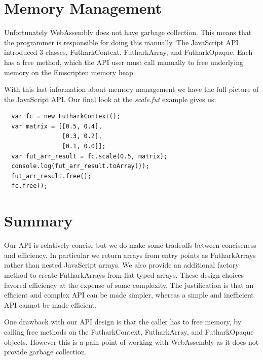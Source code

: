\documentclass[11pt]{book}
\begin{document}
\section{Memory Management}

Unfortunately WebAssembly does not have garbage collection. This means that the programmer is responsible for doing this manually. The JavaScript API introduced 3 classes, FutharkContext, FutharkArray, and FutharkOpaque. Each has a free method, which the API user must call manually to free underlying memory on the Emscripten memory heap. 

With this last information about memory management we have the full picture of the JavaScript API. Our final look at the \textit{scale.fut} example gives us:

\begin{verbatim}
  var fc = new FutharkContext();
  var matrix = [[0.5, 0.4], 
                [0.3, 0.2],
                [0.1, 0.0]];
  var fut_arr_result = fc.scale(0.5, matrix);
  console.log(fut_arr_result.toArray());
  fut_arr_result.free();
  fc.free();
\end{verbatim}

\section{Summary}


Our API is relatively concise but we do make some tradeoffs between conciseness and efficiency. In particular we return arrays from entry points as FutharkArrays rather than nested JavaScript arrays. We also provide an additional factory method to create FutharkArrays from flat typed arrays. These design choices favored efficiency at the expense of some complexity. The justification is that an efficient and complex API can be made simpler, whereas a simple and inefficient API cannot be made efficient. 

One drawback with our API design is that the caller has to free memory, by calling free methods on the FutharkContext, FutharkArray, and FutharkOpaque objects. However this is a pain point of working with WebAssembly as it does not provide garbage collection. 

\end{document}
